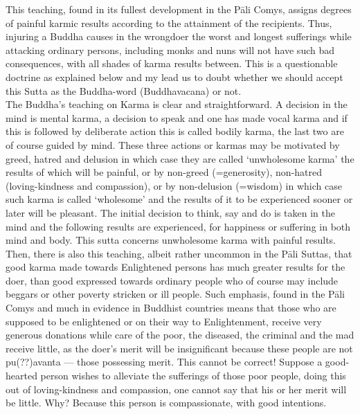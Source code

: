 This teaching, found in its fullest development in the P\=ali Comys, assigns degrees of painful karmic results according to the attainment of the recipients. Thus, injuring a Buddha causes in the wrongdoer the worst and longest sufferings while attacking ordinary persons, including monks and nuns will not have such bad consequences, with all shades of karma results between. This is a questionable doctrine as explained below and my lead us to doubt whether we should accept this Sutta as the Buddha-word (Buddhavacana) or not.\\

The Buddha's teaching on Karma is clear and straightforward. A decision in the mind is mental karma, a decision to speak and one has made vocal karma and if this is followed by deliberate action this is called bodily karma, the last two are of course guided by mind. These three actions or karmas may be motivated by greed, hatred and delusion in which case they are called `unwholesome karma' the results of which will be painful, or by non-greed (=generosity), non-hatred (loving-kindness and compassion), or by non-delusion (=wisdom) in which case such karma is called `wholesome' and the results of it to be experienced sooner or later will be pleasant. The initial decision to think, say and do is taken in the mind and the following results are experienced, for happiness or suffering in both mind and body. This sutta concerns unwholesome karma with painful results.\\

Then, there is also this teaching, albeit rather uncommon in the P\=ali Suttas, that good karma made towards Enlightened persons has much greater results for the doer, than good expressed towards ordinary people who of course may include beggars or other poverty stricken or ill people. Such emphasis, found in the P\=ali Comys and much in evidence in Buddhist countries means that those who are supposed to be enlightened or on their way to Enlightenment, receive very generous donations while care of the poor, the diseased, the criminal and the mad receive little, as the doer's merit will be insignificant because these people are not pu(??)avanta — those possessing merit. This cannot be correct! Suppose a good-hearted person wishes to alleviate the sufferings of those poor people, doing this out of loving-kindness and compassion, one cannot say that his or her merit will be little. Why? Because this person is compassionate, with good intentions.\\

